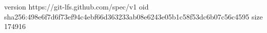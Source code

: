 version https://git-lfs.github.com/spec/v1
oid sha256:498e6f7d6f73ef94c4ebf66d363233ab08e6243e05b1c58f53dc6b07c56c4595
size 174916
